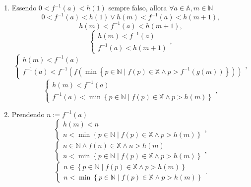 \begin{demonstration}
\begin{enumerate}[label=(\roman*)]
\begin{enumerate}[label=\arabic*.]
            \item Essendo $0<f^{-1}\left(a\right) < h\left(1\right)$ sempre falso, allora $\forall a\in\mathbb{A}, m\in\mathbb{N}$
                \[ 0<f^{-1}\left(a\right) < h\left(1\right) \lor h\left(m\right) < f^{-1}\left(a\right) < h\left(m+1\right), \]
                \[ h\left(m\right) < f^{-1}\left(a\right) < h\left(m+1\right), \]
                \[
                    \begin{cases}
                        h\left(m\right) < f^{-1}\left(a\right) \\
                        f^{-1}\left(a\right) < h\left(m+1\right)
                    \end{cases},
                \]
                \[
                    \begin{cases}
                        h\left(m\right) < f^{-1}\left(a\right) \\
                        f^{-1}\left(a\right) < f^{-1}\left(f\left( \min \left\{p\in\mathbb{N}\mid f\left(p\right)\in\mathbb{X} \land p > f^{-1}\left(g\left(m\right)\right)\right\}\right)\right)
                    \end{cases},
                \]
                \[
                    \begin{cases}
                        h\left(m\right) < f^{-1}\left(a\right) \\
                        f^{-1}\left(a\right) < \min \left\{p\in\mathbb{N}\mid f\left(p\right)\in\mathbb{X} \land p > h\left(m\right)\right\}
                    \end{cases},
                \]
            \item Prendendo $n:=f^{-1}\left(a\right)$
                \[
                    \begin{cases}
                        h\left(m\right) < n \\
                        n < \min \left\{p\in\mathbb{N}\mid f\left(p\right)\in\mathbb{X} \land p > h\left(m\right)\right\}
                    \end{cases},
                \]
                \[
                    \begin{cases}
                        n\in\mathbb{N} \land f\left(n\right)\in\mathbb{X} \land n > h\left(m\right) \\
                        n < \min \left\{p\in\mathbb{N}\mid f\left(p\right)\in\mathbb{X} \land p > h\left(m\right)\right\}
                    \end{cases},
                \]
                \[
                    \begin{cases}
                        n\in\left\{p\in\mathbb{N}\mid f\left(p\right)\in\mathbb{X} \land p > h\left(m\right)\right\} \\
                        n < \min \left\{p\in\mathbb{N}\mid f\left(p\right)\in\mathbb{X} \land p > h\left(m\right)\right\}
                    \end{cases}.
                \]


\end{enumerate}
\end{enumerate}
\end{demonstration}
